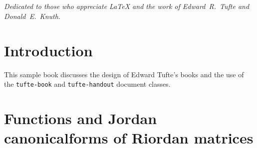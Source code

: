 \documentclass{tufte-book}
\newcommand{\monthyear}{%
  \ifcase\month\or January\or February\or March\or April\or May\or June\or
  July\or August\or September\or October\or November\or
  December\fi\space\number\year
}
\newcommand{\doccls}[1]{\texttt{#1}}%
\begin{document}

\newpage
\begin{fullwidth}
~\vfill
\thispagestyle{empty}
\setlength{\parindent}{0pt}
\setlength{\parskip}{\baselineskip}

\par{}

\par {}


\end{fullwidth}

\tableofcontents

\listoffigures

\listoftables

\cleardoublepage
~\vfill
\begin{doublespace}
\noindent\fontsize{18}{22}\selectfont\itshape
\nohyphenation
Dedicated to those who appreciate \LaTeX{}
and the work of \mbox{Edward R.~Tufte}
and \mbox{Donald E.~Knuth}.
\end{doublespace}
\vfill
\vfill


\cleardoublepage
\chapter*{Introduction}

This sample book discusses the design of Edward Tufte's
books\cite{Tufte2001,Tufte1990,Tufte1997,Tufte2006}
and the use of the \doccls{tufte-book} and \doccls{tufte-handout} document classes.


\mainmatter


\chapter{Functions and Jordan canonical\newline forms of Riordan matrices}
\label{ch:Riordan-matrices-function}


\end{document}
